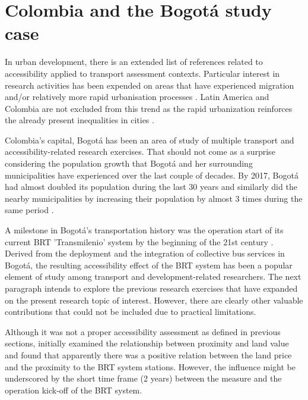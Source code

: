 \documentclass[12pt, a4paper]{report}
\begin{document}
\section{Colombia and the Bogot\'{a} study case}

In urban development, there is an extended list of references related to accessibility applied to transport assessment contexts. Particular interest in research activities has been expended on areas that have experienced migration and/or relatively more rapid urbanisation processes \citep{kojimaIntroductionPopulationMigration1996}. Latin America and Colombia are not excluded from this trend as the rapid urbanization reinforces the already present inequalities in cities \citep{wrightwendelAccessibilityUsabilityGreen2012,tellezUrbanDevelopmentBogota2018}.


Colombia's capital, Bogot\'{a} has been an area of study of multiple transport and accessibility-related research exercises. That should not come as a surprise considering the population growth that Bogot\'{a} and her surrounding municipalities have experienced over the last couple of decades. By 2017, Bogot\'{a} had almost doubled its population during the last 30 years and similarly did the nearby municipalities by increasing their population by almost 3 times during the same period \citep{guzmanCityProfileBogota2017}.

A milestone in Bogotá's transportation history was the operation start of its current BRT 'Transmilenio' system by the beginning of the 21st century \citep{rodriguezValueAccessibilityBogota2004}. Derived from the deployment and the integration of collective bus services in Bogotá, the resulting accessibility effect of the BRT system has been a popular element of study among transport and development-related researchers. The next paragraph intends to explore the previous research exercises that have expanded on the present research topic of interest. However, there are clearly other valuable contributions that could not be included due to practical limitations.


Although it was not a proper accessibility assessment as defined in previous sections, \cite{rodriguezValueAccessibilityBogota2004} initially examined the relationship between proximity and land value and found that apparently there was a positive relation between the land price and the proximity to the BRT system stations. However, the influence might be underscored by the short time frame (2 years) between the measure and the operation kick-off of the BRT system.
\end{document}
